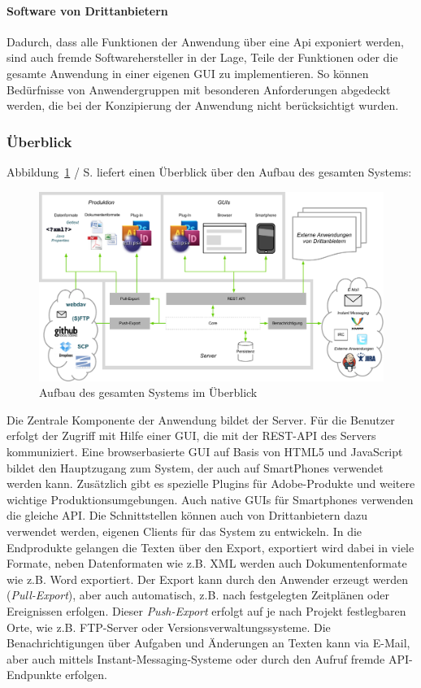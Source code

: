 \paragraph{Software von Drittanbietern} Dadurch, dass alle Funktionen der Anwendung über eine Api exponiert werden, sind auch fremde Softwarehersteller in der Lage, Teile der Funktionen oder die gesamte Anwendung in einer eigenen GUI zu implementieren. So können Bedürfnisse von Anwendergruppen mit besonderen Anforderungen abgedeckt werden, die bei der Konzipierung der Anwendung nicht berücksichtigt wurden.

\subsubsection{Überblick}

Abbildung~\ref{chart:gesamtessystem} / S.\pageref{chart:gesamtessystem} liefert einen Überblick über den Aufbau des gesamten Systems:

\begin{figure}[htb]
\begin{center}
\includegraphics[width=\textwidth]{media/GesamtesSystem.pdf}
\caption{Aufbau des gesamten Systems im Überblick}
\label{chart:gesamtessystem}
\end{center}
\end{figure}

Die Zentrale Komponente der Anwendung bildet der Server. Für die Benutzer erfolgt der Zugriff mit Hilfe einer GUI, die mit der REST-API des Servers kommuniziert. Eine browserbasierte GUI auf Basis von HTML5 und JavaScript bildet den Hauptzugang zum System, der auch auf SmartPhones verwendet werden kann. Zusätzlich gibt es spezielle Plugins für Adobe-Produkte und weitere wichtige Produktionsumgebungen. Auch native GUIs für Smartphones verwenden die gleiche API. Die Schnittstellen können auch von Drittanbietern dazu verwendet werden, eigenen Clients für das System zu entwickeln. In die Endprodukte gelangen die Texten über den Export, exportiert wird dabei in viele Formate, neben Datenformaten wie z.B. XML werden auch Dokumentenformate wie z.B. Word exportiert. Der Export kann durch den Anwender erzeugt werden (\emph{Pull-Export}), aber auch automatisch, z.B. nach festgelegten Zeitplänen oder Ereignissen erfolgen. Dieser \emph{Push-Export} erfolgt auf je nach Projekt festlegbaren Orte, wie z.B. FTP-Server oder Versionsverwaltungssysteme. Die Benachrichtigungen über Aufgaben und Änderungen an Texten kann via E-Mail, aber auch mittels Instant-Messaging-Systeme oder durch den Aufruf fremde API-Endpunkte erfolgen.
